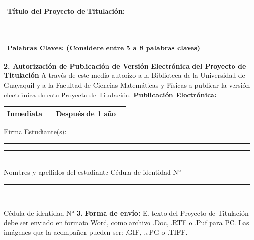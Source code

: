\documentclass[12pt, a4paper, nofontenc, numbers=endperiod]{apa7}
\begin{document}
{{\begin{tabular}{|p{15.5cm}|}
					\hline
					\textbf{\footnotesize Título del Proyecto de Titulación:} \\
					\hline
				\end{tabular}  \\[-0.6cm]
				\justify
				\begin{tabular}{|p{15.5cm}|}
					\hline
					\textbf{\footnotesize Palabras Claves: (Considere entre 5 a 8 palabras claves)} \\
					\hline
				\end{tabular}	
				\justify
				\textbf{\footnotesize 2. Autorización de Publicación de Versión Electrónica del Proyecto de Titulación } 
				\vspace{-0.2cm} 
				\justify
				\footnotesize A través de este medio autorizo a la Biblioteca de la Universidad de Guayaquil y a la Facultad de Ciencias Matemáticas y Físicas a publicar la versión electrónica de este Proyecto de  Titulación.
				\justify
				\textbf{Publicación Electrónica:}
				\justify
				\begin{tabular}{|p{6.6cm}|p{0.5cm}|p{6.6cm}|p{0.5cm}|}
					\hline
					\footnotesize Inmediata &  & \footnotesize Después de 1 año  &  \\
					\hline
				\end{tabular}
				\justify
				\footnotesize Firma Estudiante(s): \\[0.70cm]
				\hspace*{1.1cm} \rule[0mm]{58mm}{0.1mm} \hspace*{1.7cm} {\rule[0mm]{58mm}{0.1mm}\\
					\hspace*{1.5cm}Nombres y apellidos del estudiante
					\vspace*{0.7cm}
					\hspace*{3cm} Cédula de identidad N° \\
					\hspace*{1.1cm} {\color{red}\rule[0mm]{58mm}{0.1mm}} \hspace*{1.7cm} {\color{red}\rule[0mm]{58mm}{0.1mm}} \\
					\hspace*{3cm} {\color{red}Cédula de identidad N°}
					\vspace{-0.2cm} 
					\justify	
					\textbf{\footnotesize  3. Forma de envío: }
					\justify
					\vspace{-0.2cm}
					\footnotesize El texto del Proyecto de Titulación debe ser enviado en formato Word, como archivo .Doc, .RTF o .Puf para PC. Las imágenes que la acompañen pueden ser: .GIF, .JPG o .TIFF. 
					
}}}
\end{document}
